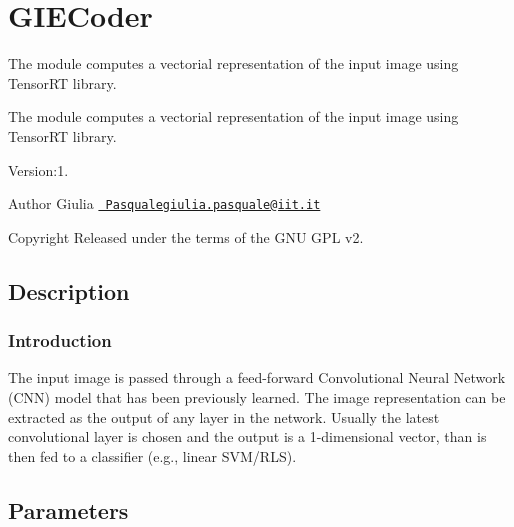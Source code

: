 \section{G\+I\+E\+Coder}
\label{group__GIECoder}


The module computes a vectorial representation of the input image using Tensor\+RT library.  


The module computes a vectorial representation of the input image using Tensor\+RT library. 

Version\+:1. \begin{DoxyAuthor}{Author}
Giulia \href{mailto:Pasqualegiulia.pasquale@iit.it}{\texttt{ Pasqualegiulia.\+pasquale@iit.\+it}} ~\newline
 
\end{DoxyAuthor}
\begin{DoxyCopyright}{Copyright}
Released under the terms of the G\+NU G\+PL v2. 
\end{DoxyCopyright}
\hypertarget{group__GIECoder_intro_sec}{}\subsection{Description}\label{group__GIECoder_intro_sec}
\hypertarget{group__GIECoder_sec-intro}{}\subsubsection{Introduction}\label{group__GIECoder_sec-intro}
The input image is passed through a feed-\/forward Convolutional Neural Network (C\+NN) model that has been previously learned. The image representation can be extracted as the output of any layer in the network. Usually the latest convolutional layer is chosen and the output is a 1-\/dimensional vector, than is then fed to a classifier (e.\+g., linear S\+V\+M/\+R\+LS).\hypertarget{group__GIECoder_parameters_sec}{}\subsection{Parameters}\label{group__GIECoder_parameters_sec}

